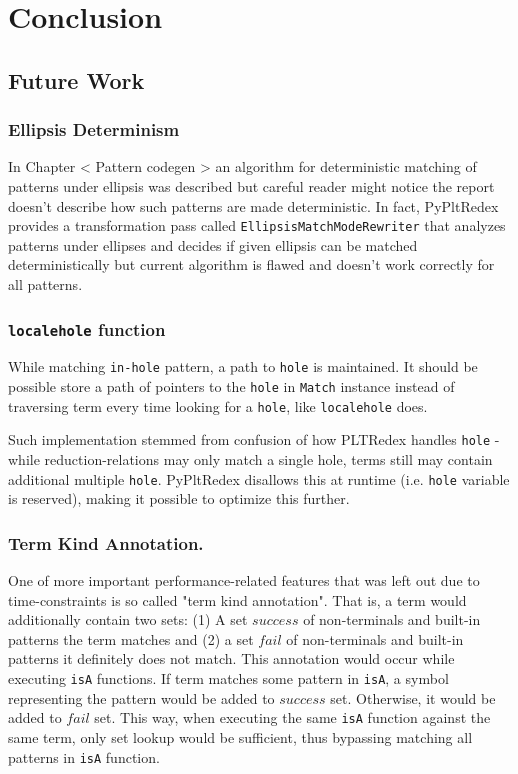 \chapter{Conclusion} 

\section{Future Work}
\subsection{Ellipsis Determinism}
In Chapter < Pattern codegen > an algorithm for deterministic matching of patterns under ellipsis was described but careful reader might notice the report doesn't describe how such patterns are made deterministic. In fact, PyPltRedex provides a transformation pass called \texttt{EllipsisMatchModeRewriter} that analyzes patterns under ellipses and decides if given ellipsis can be matched deterministically but current algorithm is flawed and doesn't work correctly for all patterns. 

\subsection{\texttt{localehole} function}
While matching \texttt{in-hole} pattern, a path to \texttt{hole} is maintained. It should be possible store a path of pointers to the \texttt{hole} in \texttt{Match} instance instead of traversing term every time looking for a \texttt{hole}, like \texttt{localehole} does.

Such implementation stemmed from confusion of how PLTRedex handles \texttt{hole} - while reduction-relations may only match a single hole, terms still may contain additional multiple \texttt{hole}. PyPltRedex disallows this at runtime (i.e. \texttt{hole} variable is reserved), making it possible to optimize this further.

\subsection{Term Kind Annotation.}
One of more important performance-related features that was left out due to time-constraints is so called "term kind annotation". That is, a term would additionally contain two sets: (1) A set $success$ of non-terminals and built-in patterns the term matches and (2) a set $fail$ of non-terminals and built-in patterns it definitely does not match. This annotation would occur while executing \texttt{isA} functions. If term matches some pattern in \texttt{isA}, a symbol representing the pattern would be added to $success$ set. Otherwise, it would be added to $fail$ set. This way, when executing the same \texttt{isA} function against the same term, only set lookup would be sufficient, thus bypassing matching all patterns in \texttt{isA} function.

